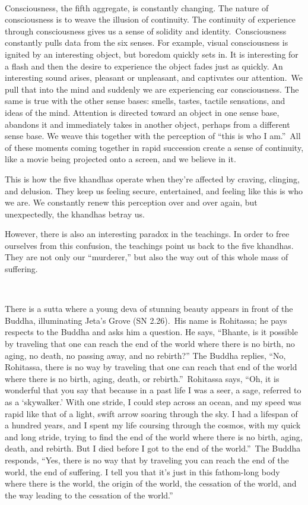 ~

Consciousness, the fifth aggregate, is constantly changing. The nature of consciousness is to weave the illusion of continuity. The continuity of experience through consciousness gives us a sense of solidity and identity.~Consciousness constantly pulls data from the six senses. For example, visual consciousness is ignited by an interesting object, but boredom quickly sets in. It is interesting for a flash and then the desire to experience the object fades just as quickly. An interesting sound arises, pleasant or unpleasant, and captivates our attention.~We pull that into the mind and suddenly we are experiencing ear consciousness. The same is true with the other sense bases: smells, tastes, tactile sensations, and ideas of the mind. Attention is directed toward an object in one sense base, abandons it and immediately takes in another object, perhaps from a different sense base. We weave this together with the perception of ``this is who I am.''~All of these moments coming together in rapid succession create a sense of continuity, like a movie being projected onto a screen, and we believe in it.~

This is how the five khandhas operate when they're affected by craving, clinging, and delusion. They keep us feeling secure, entertained, and feeling like this is who we are. We constantly renew this perception over and over again, but unexpectedly, the khandhas betray us.~

However, there is also an interesting paradox in the teachings. In order to free ourselves from this confusion, the teachings point us back to the five khandhas. They are not only our ``murderer,'' but also the way out of this whole mass of suffering.~~

~

There is a sutta where a young deva of stunning beauty appears in front of the Buddha, illuminating Jeta's Grove (SN 2.26).~His name is Rohitassa; he pays respects to the Buddha and asks him a question. He says, ``Bhante, is it possible by traveling that one can reach the end of the world where there is no birth, no aging, no death, no passing away, and no rebirth?'' The Buddha replies, ``No, Rohitassa, there is no way by traveling that one can reach that end of the world where there is no birth, aging, death, or rebirth.''~Rohitassa says, ``Oh, it is wonderful that you say that because in a past life I was a seer, a sage, referred to as a `skywalker.' With one stride, I could step across an ocean, and my speed was rapid like that of a light, swift arrow soaring through the sky. I had a lifespan of a hundred years, and I spent my life coursing through the cosmos, with my quick and long stride, trying to find the end of the world where there is no birth, aging, death, and rebirth. But I died before I got to the end of the world.''~The Buddha responds, ``Yes, there is no way that by traveling you can reach the end of the world, the end of suffering. I tell you that it's just in this fathom-long body where there is the world, the origin of the world, the cessation of the world, and the way leading to the cessation of the world.''~~

